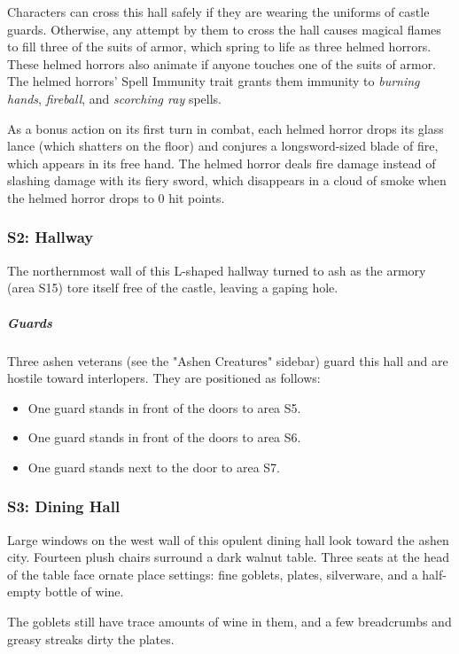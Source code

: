\documentclass[10pt,a4paper,twoside,bg=print,twocolumn,openany,nodeprecatedcode]{dndbook}
\begin{document}
Characters can cross this hall safely if they are wearing the uniforms of castle guards. Otherwise, any attempt by them to cross the hall causes magical flames to fill three of the suits of armor, which spring to life as three helmed horrors. These helmed horrors also animate if anyone touches one of the suits of armor. The helmed horrors' Spell Immunity trait grants them immunity to \textit{burning hands}, \textit{fireball}, and \textit{scorching ray} spells.

As a bonus action on its first turn in combat, each helmed horror drops its glass lance (which shatters on the floor) and conjures a longsword-sized blade of fire, which appears in its free hand. The helmed horror deals fire damage instead of slashing damage with its fiery sword, which disappears in a cloud of smoke when the helmed horror drops to 0 hit points.

\subsubsection{S2: Hallway}
The northernmost wall of this L-shaped hallway turned to ash as the armory (area S15) tore itself free of the castle, leaving a gaping hole.

\subparagraph{Guards}
Three ashen veterans (see the "Ashen Creatures" sidebar) guard this hall and are hostile toward interlopers. They are positioned as follows:


\begin{itemize}
\item One guard stands in front of the doors to area S5.
\item One guard stands in front of the doors to area S6.
\item One guard stands next to the door to area S7.
\end{itemize}

\subsubsection{S3: Dining Hall}
\begin{DndReadAloud}{}
Large windows on the west wall of this opulent dining hall look toward the ashen city. Fourteen plush chairs surround a dark walnut table. Three seats at the head of the table face ornate place settings: fine goblets, plates, silverware, and a half-empty bottle of wine.

\end{DndReadAloud}

The goblets still have trace amounts of wine in them, and a few breadcrumbs and greasy streaks dirty the plates.
\end{document}

